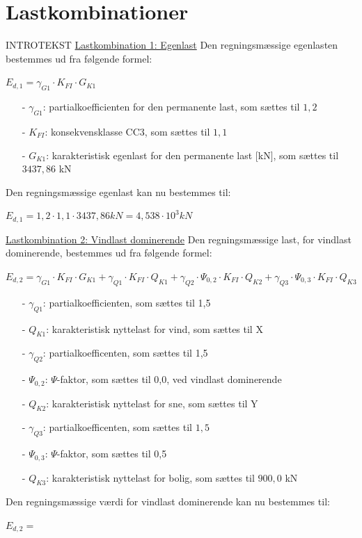 \section{Lastkombinationer}
INTROTEKST
\newline
\newline
\underline{Lastkombination 1: Egenlast}
\newline
Den regningsmæssige egenlasten bestemmes ud fra følgende formel:
\begin{center}
	$E_{d,1}=\gamma_{G1}\cdot K_{FI}\cdot G_{K1}$
\end{center}
\begin{itemize}
	\item[-] $\gamma_{G1}$: partialkoefficienten for den permanente last, som sættes til $1,\!2$ \citep[ tabel A 1.2(B+C) anneks A.1.3.1]{EU90}
	\item[-] $K_{FI}$: konsekvensklasse CC3, som sættes til $1,\!1$ \citep[ tabel A 1.2(A) anneks A.1.3.1]{EU90}
	\item[-] $G_{K1}$: karakteristisk egenlast for den permanente last [kN], som sættes til $3437,\!86$ kN
\end{itemize}
Den regningsmæssige egenlast kan nu bestemmes til:
\begin{center}
	$E_{d,1}=1,\!2\cdot 1,1\cdot 3437,\!86 kN=4,\!538\cdot 10^3 kN$
\end{center}
\underline{Lastkombination 2: Vindlast dominerende}
\newline
Den regningsmæssige last, for vindlast dominerende, bestemmes ud fra følgende formel:
\begin{center}
	$E_{d,2}=\gamma_{G1}\cdot K_{FI}\cdot G_{K1}+\gamma_{Q1}\cdot K_{FI}\cdot Q_{K1}+\gamma_{Q2}\cdot \Psi_{0,2}\cdot K_{FI}\cdot Q_{K2}+\gamma_{Q3}\cdot \Psi_{0,3}\cdot K_{FI}\cdot Q_{K3}$
\end{center}
\begin{itemize}
	\item[-] $\gamma_{Q1}$: partialkoefficienten, som sættes til 1,5 \citep[ tabel A 1.2(B+C) anneks A.1.3.1]{EU90}
	\item[-] $Q_{K1}$: karakteristisk nyttelast for vind, som sættes til X
	\item[-] $\gamma_{Q2}$: partialkoefficenten, som sættes til 1,5 \citep[ tabel A 1.2(B+C) anneks A.1.3.1]{EU90}
	\item[-] $\Psi_{0,2}$: $\Psi$-faktor, som sættes til 0,0, ved vindlast dominerende \citep[ tabel A 1.1 anneks A.1.2.2]{EU90}
	\item[-] $Q_{K2}$: karakteristisk nyttelast for sne, som sættes til Y
	\item[-] $\gamma_{Q3}$: partialkoefficenten, som sættes til $1,\!5$ \citep[ tabel A 1.2(B+C) anneks A.1.3.1]{EU90}
	\item[-] $\Psi_{0,3}$: $\Psi$-faktor, som sættes til 0,5 \citep[ tabel A 1.1 anneks A.1.2.2]{EU90}
	\item[-] $Q_{K3}$: karakteristisk nyttelast for bolig, som sættes til $900,\!0$ kN
\end{itemize}
Den regningsmæssige værdi for vindlast dominerende kan nu bestemmes til:
\begin{center}
	$E_{d,2}=$
\end{center}


